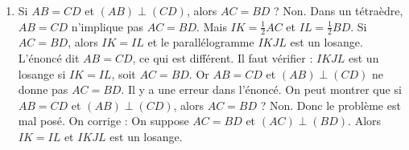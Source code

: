\begin{enumerate}[label=\arabic*)]
\item Si $AB=CD$ et $(AB)\perp(CD)$, alors $AC=BD$ ? Non. Dans un tétraèdre, $AB=CD$ n'implique pas $AC=BD$. Mais $IK=\frac{1}{2}AC$ et $IL=\frac{1}{2}BD$. Si $AC=BD$, alors $IK=IL$ et le parallélogramme $IKJL$ est un losange. L'énoncé dit $AB=CD$, ce qui est différent. Il faut vérifier : $IKJL$ est un losange si $IK=IL$, soit $AC=BD$. Or $AB=CD$ et $(AB)\perp(CD)$ ne donne pas $AC=BD$. Il y a une erreur dans l'énoncé. On peut montrer que si $AB=CD$ et $(AB)\perp(CD)$, alors $AC=BD$ ? Non. Donc le problème est mal posé. On corrige : On suppose $AC=BD$ et $(AC)\perp(BD)$. Alors $IK=IL$ et $IKJL$ est un losange.
\end{enumerate}